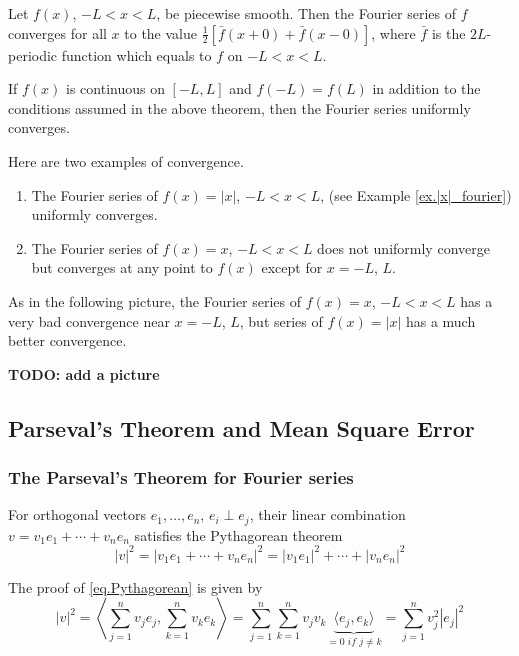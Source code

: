 \begin{theorem}
Let $f(x)$, $-L<x<L$, be piecewise smooth. Then the Fourier series of $f$ converges for all $x$ to the value $\frac{1}{2}[\bar{f}(x+0)+\bar{f}(x-0)]$, where $\bar{f}$ is the $2 L$-periodic function which equals to $f$ on $-L<x<L$.

If $f(x)$ is continuous on $[-L, L]$ and $f(-L)=f(L)$ in addition to the conditions assumed in the above theorem, then the Fourier series uniformly converges.
\end{theorem}

\begin{example}[] Here are two examples of convergence.

    \begin{enumerate}
        \item The Fourier series of $f(x)=|x|$, $-L<x<L$, (see Example \ref{ex.|x|_fourier}) uniformly converges. 
        
        \item The Fourier series of $f(x)=x$, $-L<x<L$ does not uniformly converge but converges at any point to $f(x)$ except for $x = -L$, $L$. 
    \end{enumerate}

    As in the following picture, the Fourier series of $f(x)=x$, $-L<x<L$ has a very bad convergence near $x = -L$, $L$, but series of $f(x)=|x|$ has a much better convergence.

    \textbf{TODO: add a picture}
\end{example}

\subsection{Parseval's Theorem and Mean Square Error}

\subsubsection{The Parseval's Theorem for Fourier series}

For orthogonal vectors $e_1,\dots, e_{n}$, $e_i\perp e_j$, their linear combination $v = v_1 e_1+\cdots+v_n e_n$ satisfies the Pythagorean theorem
\begin{equation}\label{eq.Pythagorean}
    |v|^2 = |v_1 e_1+\cdots+v_n e_n|^2 = |v_1 e_1|^2+\cdots+|v_n e_n|^2
\end{equation}

The proof of \eqref{eq.Pythagorean} is given by 
\begin{equation*}
    |v|^2 = \left\langle\sum_{j = 1}^{n}v_j e_j, \sum_{k = 1}^{n}v_k e_k\right\rangle = \sum_{j = 1}^{n}\sum_{k = 1}^{n}v_jv_k\underbrace{\langle e_j, e_k\rangle}_{= 0\textit{ if }j\neq k} = \sum_{j = 1}^{n}v_j^2 |e_j|^2
\end{equation*}

